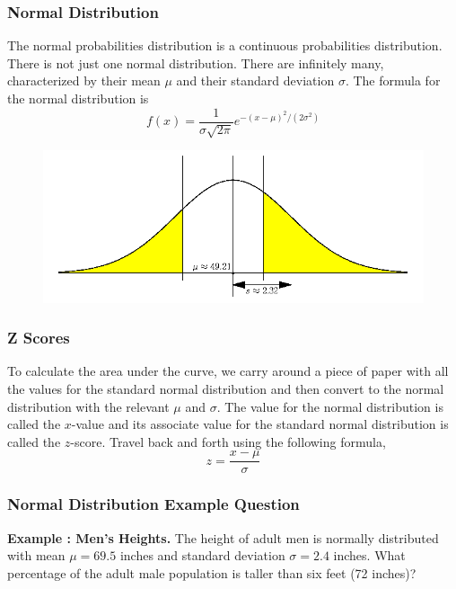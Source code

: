 \documentclass[xcolor=dvipsnames]{beamer}
\newcounter{expls}
\newcommand{\beispiel}[1]{\refstepcounter{expls}\textbf{Example \arabic{expls}: #1.}}
\begin{document}
\begin{frame}
  \frametitle{Normal Distribution}
  The normal probabilities distribution is a \alert{continuous}
  probabilities distribution. There is not just one normal
  distribution. There are infinitely many, characterized by their
  \alert{mean $\mu$} and their \alert{standard deviation $\sigma$}.
  The formula for the normal distribution is
  \begin{equation}
    \label{eq:aitoolah}
    f(x)=\frac{1}{\sigma\sqrt{2\pi}}e^{-(x-\mu)^{2}/(2\sigma^{2})}
  \end{equation}
  \begin{figure}[h]
    \includegraphics[scale=.4]{./qfour.png}
  \end{figure}
\end{frame}

\begin{frame}
  \frametitle{Z Scores}
  To calculate the area under the curve, we carry around a piece of
  paper with all the values for the \alert{standard normal
    distribution} and then convert to the normal distribution with the
  relevant $\mu$ and $\sigma$. The value for the normal distribution
  is called the \alert{$x$-value} and its associate value for the
  standard normal distribution is called the \alert{$z$-score}. Travel
  back and forth using the following formula,
  \begin{equation}
    \label{eq:uotoogoo}
    z=\frac{x-\mu}{\sigma}
  \end{equation}
\end{frame}

\begin{frame}
  \frametitle{Normal Distribution Example Question}
  \beispiel{Men's Heights} The height of adult men is normally
  distributed with mean $\mu=69.5$ inches and standard deviation
  $\sigma=2.4$ inches. What percentage of the adult male population is
  taller than six feet (72 inches)? 
\end{frame}
\end{document}
